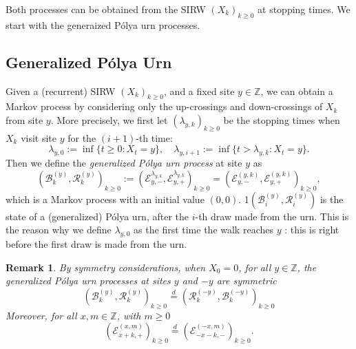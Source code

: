 \documentclass[twoside,12pt,a4paper]{article}
\newtheorem{remark}{Remark}[section]
\numberwithin{equation}{section}
\newcommand{\comment}[1]{\textcolor{blue}{#1}}
\begin{document}
	Both processes can be obtained from the SIRW $(X_k)_{k\geq 0}$ at stopping times. We start with the generaized P\'{o}lya urn processes. 
	
	\subsection{Generalized P\'{o}lya  Urn}
	Given a (recurrent) SIRW $(X_k)_{k\geq 0}$, and a fixed site $y\in \mathbb{Z}$, we can obtain a Markov process by considering only the up-crossings and down-crossings of $X_k$ from site $y$. More precisely, we first let $(\lambda_{y,k})_{k\geq 0}$ be the stopping times when $X_k$ visit site $y$ for the $\left( i+1 \right) $-th time:
	\[
	\lambda_{y,0} :=\inf\{ t\geq 0: X_t = y \} , \quad \lambda_{y,i+1} := \inf\{ t> \lambda_{y, k}: X_t = y \}.
	\] 
	Then we define the \textit{generalized P\'olya urn process} at site $y$ as 
	\begin{equation} \label{eq: RW to GPU}
		\left(\mathcal{B}^{(y)}_{k},\mathcal{R}^{(y)}_{k} \right)_{k\ge 0}
		:=\left(\mathcal{E}^{\lambda_{y,k}}_{y,-}, \mathcal{E}^{\lambda_{y,k}}_{y,+}\right)_{k\geq 0} 
		=  \left(\mathcal{E}^{(y,k)}_{y,-}, \mathcal{E}^{(y,k)}_{y,+}\right)_{k\geq 0},
	\end{equation}
	which is a Markov process with an initial value $(0,0)$. 
	1$\left(\mathcal{B}_{i}^{(y)},\mathcal{R}_{i}^{(y)} \right)$ is the state of a (generalized) P\'olya urn, after the $i$-th draw made from the urn. This is the reason why we define $\lambda_{y, 0}$ as the first time the walk reaches $y$ : this is right before the first draw is made from the urn. 
	\begin{remark}
		\label{rem:symmetry}
		By symmetry considerations, when $X_0 = 0$, for all $y \in \mathbb{Z}$, the generalized P\'{o}lya urn processes at sites $y$ and $-y$ are symmetric
		$$\left(\mathcal{B}^{(y)}_{k},\mathcal{R}^{(y)}_{k} \right)_{k\ge 0}
		\overset{d}{=} 
		\left(\mathcal{R}^{(-y)}_{k},\mathcal{B}^{(-y)}_{k} \right)_{k\ge 0} $$
		Moreover, for all $x, m \in \mathbb{Z}$, with $m\geq 0$
		\[
		\left(\mathcal{E}^{(x,m)}_{x+k,+} \right)_{k\geq 0} \overset{d}{=} \left(\mathcal{E}^{(-x,m)}_{-x-k,-} \right)_{k\geq 0}.
		\]
	\end{remark}
	
	
	
\end{document}
